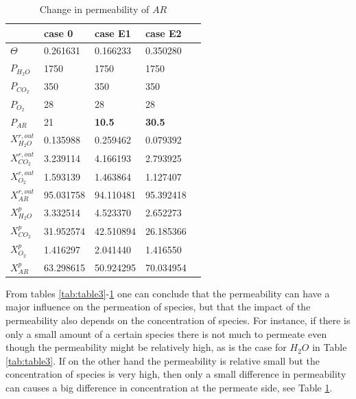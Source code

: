 \begin{table}[H]
\centering
\caption{Change in permeability of $AR$}
\label{tab:table6}
\begin{tabular}{|l|l|l|l|l|}
\hline
                    & case 0        & case E1       & case E2        \\ \hline
$\Theta$            & 0.261631      & 0.166233      & 0.350280       \\ \hline
$P_{H_2O}$          & 1750          & 1750          & 1750           \\ \hline
$P_{CO_2}$          & 350           & 350           & 350            \\ \hline
$P_{O_2}$           & 28            & 28            & 28             \\ \hline
$P_{AR}$            & 21            & \textbf{10.5} & \textbf{30.5}  \\ \hline \hline
$X^{r,out}_{H_2O}$  & 0.135988      & 0.259462      & 0.079392       \\ \hline
$X^{r,out}_{CO_2}$  & 3.239114      & 4.166193      & 2.793925       \\ \hline
$X^{r,out}_{O_2}$   & 1.593139      & 1.463864      & 1.127407       \\ \hline
$X^{r,out}_{AR}$    & 95.031758     & 94.110481     & 95.392418      \\ \hline
$X^{p}_{H_2O}$      & 3.332514      & 4.523370      & 2.652273       \\ \hline
$X^{p}_{CO_2}$      & 31.952574     & 42.510894    & 26.185366      \\ \hline
$X^{p}_{O_2}$       & 1.416297      & 2.041440      & 1.416550       \\ \hline
$X^{p}_{AR}$        & 63.298615     & 50.924295     & 70.034954     \\ \hline
\end{tabular}
\end{table}

From tables \ref{tab:table3}-\ref{tab:table6} one can conclude that the permeability can have a major influence on the permeation of species, but that the impact of the permeability also depends on the concentration of species. For instance, if there is only a small amount of a certain species there is not much to permeate even though the permeability might be relatively high, as is the case for $H_2O$ in Table \ref{tab:table3}. If on the other hand the permeability is relative small but the concentration of species is very high, then only a small difference in permeability can causes a big difference in concentration at the permeate side, see Table \ref{tab:table6}.  